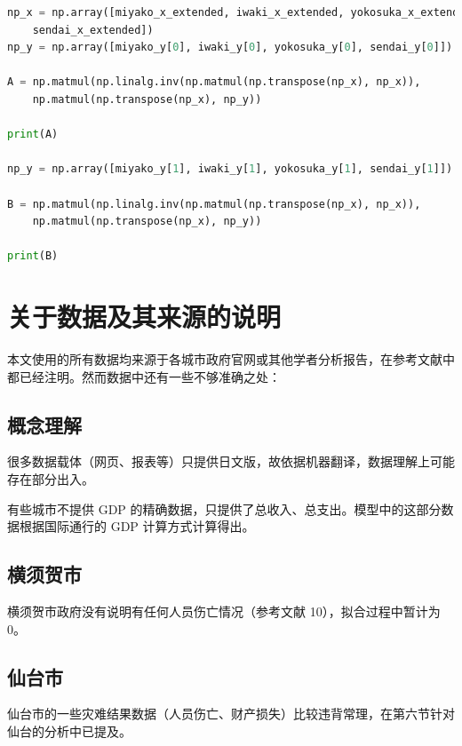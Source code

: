 \documentclass[UTF8]{ctexart}
\begin{document}
\begin{lstlisting}[language=Python]
np_x = np.array([miyako_x_extended, iwaki_x_extended, yokosuka_x_extended, 
    sendai_x_extended])
np_y = np.array([miyako_y[0], iwaki_y[0], yokosuka_y[0], sendai_y[0]])

A = np.matmul(np.linalg.inv(np.matmul(np.transpose(np_x), np_x)), 
    np.matmul(np.transpose(np_x), np_y))

print(A)

np_y = np.array([miyako_y[1], iwaki_y[1], yokosuka_y[1], sendai_y[1]])

B = np.matmul(np.linalg.inv(np.matmul(np.transpose(np_x), np_x)), 
    np.matmul(np.transpose(np_x), np_y))

print(B)
\end{lstlisting}



\section{关于数据及其来源的说明}
本文使用的所有数据均来源于各城市政府官网或其他学者分析报告，在参考文献中都已经注明。然而数据中还有一些不够准确之处：
\subsection{概念理解}
很多数据载体（网页、报表等）只提供日文版，故依据机器翻译，数据理解上可能存在部分出入。

有些城市不提供 GDP 的精确数据，只提供了总收入、总支出。模型中的这部分数据根据国际通行的 GDP 计算方式计算得出。
\subsection{横须贺市}
横须贺市政府没有说明有任何人员伤亡情况（参考文献 10），拟合过程中暂计为 0。
\subsection{仙台市}
仙台市的一些灾难结果数据（人员伤亡、财产损失）比较违背常理，在第六节针对仙台的分析中已提及。
\end{document}
